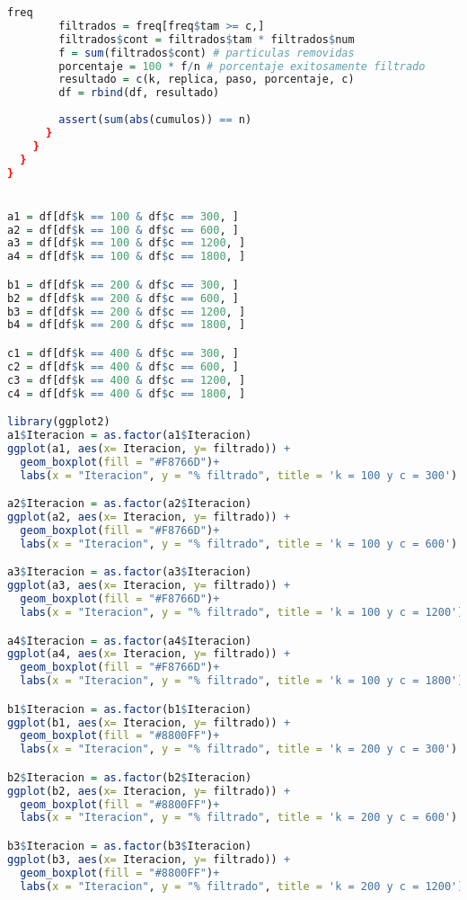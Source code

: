 \documentclass{article}
\begin{document}
\begin{lstlisting}[language=R, caption= Código para graficar el porcentaje de filtrado en cada iteración.]
        freq
        filtrados = freq[freq$tam >= c,]
        filtrados$cont = filtrados$tam * filtrados$num
        f = sum(filtrados$cont) # particulas removidas
        porcentaje = 100 * f/n # porcentaje exitosamente filtrado
        resultado = c(k, replica, paso, porcentaje, c)
        df = rbind(df, resultado)
        
        assert(sum(abs(cumulos)) == n)
      }  
    }
  } 
}


a1 = df[df$k == 100 & df$c == 300, ]
a2 = df[df$k == 100 & df$c == 600, ]
a3 = df[df$k == 100 & df$c == 1200, ]
a4 = df[df$k == 100 & df$c == 1800, ]

b1 = df[df$k == 200 & df$c == 300, ]
b2 = df[df$k == 200 & df$c == 600, ]
b3 = df[df$k == 200 & df$c == 1200, ]
b4 = df[df$k == 200 & df$c == 1800, ]

c1 = df[df$k == 400 & df$c == 300, ]
c2 = df[df$k == 400 & df$c == 600, ]
c3 = df[df$k == 400 & df$c == 1200, ]
c4 = df[df$k == 400 & df$c == 1800, ]

library(ggplot2)
a1$Iteracion = as.factor(a1$Iteracion)
ggplot(a1, aes(x= Iteracion, y= filtrado)) + 
  geom_boxplot(fill = "#F8766D")+
  labs(x = "Iteracion", y = "% filtrado", title = 'k = 100 y c = 300')

a2$Iteracion = as.factor(a2$Iteracion)
ggplot(a2, aes(x= Iteracion, y= filtrado)) + 
  geom_boxplot(fill = "#F8766D")+
  labs(x = "Iteracion", y = "% filtrado", title = 'k = 100 y c = 600')

a3$Iteracion = as.factor(a3$Iteracion)
ggplot(a3, aes(x= Iteracion, y= filtrado)) + 
  geom_boxplot(fill = "#F8766D")+
  labs(x = "Iteracion", y = "% filtrado", title = 'k = 100 y c = 1200')

a4$Iteracion = as.factor(a4$Iteracion)
ggplot(a4, aes(x= Iteracion, y= filtrado)) + 
  geom_boxplot(fill = "#F8766D")+
  labs(x = "Iteracion", y = "% filtrado", title = 'k = 100 y c = 1800')

b1$Iteracion = as.factor(b1$Iteracion)
ggplot(b1, aes(x= Iteracion, y= filtrado)) + 
  geom_boxplot(fill = "#8800FF")+
  labs(x = "Iteracion", y = "% filtrado", title = 'k = 200 y c = 300')

b2$Iteracion = as.factor(b2$Iteracion)
ggplot(b2, aes(x= Iteracion, y= filtrado)) + 
  geom_boxplot(fill = "#8800FF")+
  labs(x = "Iteracion", y = "% filtrado", title = 'k = 200 y c = 600')

b3$Iteracion = as.factor(b3$Iteracion)
ggplot(b3, aes(x= Iteracion, y= filtrado)) + 
  geom_boxplot(fill = "#8800FF")+
  labs(x = "Iteracion", y = "% filtrado", title = 'k = 200 y c = 1200')


\end{lstlisting}
\end{document}
